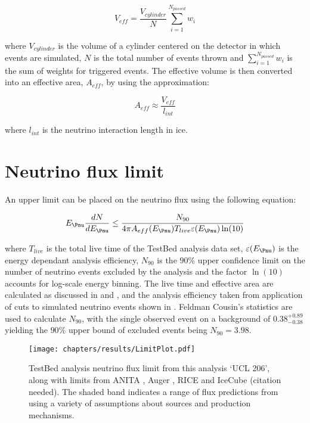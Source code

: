 \begin{equation}
  V_{eff} = \frac {V_{cylinder}}{N} \sum_{i=1}^{N_{passed}} w_{i}
\end{equation}

\noindent where $V_{cylinder}$ is the volume of a cylinder centered on the detector in which events are simulated, $N$ is the total number of events thrown and $\sum_{i=1}^{N_{passed}} w_{i}$ is the sum of weights for triggered events. The effective volume is then converted into an effective area, $A_{eff}$, by using the approximation:

\begin{equation}
  A_{eff} \approx \frac{V_{eff}}{l_{int}}
\end{equation}

\noindent where $l_{int}$ is the neutrino interaction length in ice. 

\section{Neutrino flux limit}
\label{sec:Results:Limit}

An upper limit can be placed on the neutrino flux using the following equation:

\begin{equation}
  E_{\Pnu} \frac {dN}{dE_{\Pnu}} \leq \frac{N_{90}}{4\pi A_{eff}(E_{\Pnu}) T_{live} \varepsilon(E_{\Pnu}) \ln(10)}
\end{equation}

\noindent where $T_{live}$ is the total live time of the TestBed analysis data set, $\varepsilon(E_{\Pnu})$ is the energy dependant analysis efficiency, $N_{90}$ is the $90\%$ upper confidence limit on the number of neutrino events excluded by the analysis and the factor $\ln(10)$ accounts for log-scale energy binning. The live time and effective area are calculated as discussed in  and , and the analysis efficiency taken from application of cuts to simulated neutrino events shown in . Feldman Cousin's statistics are used to calculate $N_{90}$, with the single observed event on a background of $0.38^{+0.89}_{-0.38}$ yielding the $90\%$ upper bound of excluded events being $N_{90}=3.98$.

\begin{figure}[htpb]
  \texttt{[image: chapters/results/LimitPlot.pdf]}
  \caption{TestBed analysis neutrino flux limit from this analysis `UCL 206', along with limits from ANITA \cite{Gorham:2010kv}, Auger \cite{Abraham:2009eh}, RICE \cite{PhysRevD.73.082002} and IceCube (citation needed). The shaded band indicates a range of flux predictions from \cite{Kotera.2010} using a variety of assumptions about sources and production mechanisms.}
  \label{fig:Results:Limit-Plot}
\end{figure}

